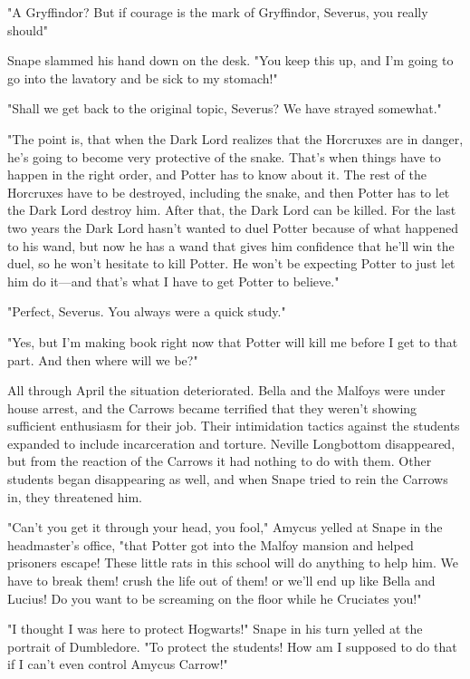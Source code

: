 "A Gryffindor? But if courage is the mark of Gryffindor, Severus, you really should{\el}"

Snape slammed his hand down on the desk. "You keep this up, and I'm going to go into the lavatory and be sick to my stomach!"

"Shall we get back to the original topic, Severus? We have strayed somewhat."

"The point is, that when the Dark Lord realizes that the Horcruxes are in danger, he's going to become very protective of the snake. That's when things have to happen in the right order, and Potter has to know about it. The rest of the Horcruxes have to be destroyed, including the snake, and then Potter has to let the Dark Lord destroy him. After that, the Dark Lord can be killed. For the last two years the Dark Lord hasn't wanted to duel Potter because of what happened to his wand, but now he has a wand that gives him confidence that he'll win the duel, so he won't hesitate to kill Potter. He won't be expecting Potter to just let him do it—and that's what I have to get Potter to believe."

"Perfect, Severus. You always were a quick study."

"Yes, but I'm making book right now that Potter will kill me before I get to that part. And then where will we be?"

All through April the situation deteriorated. Bella and the Malfoys were under house arrest, and the Carrows became terrified that they weren't showing sufficient enthusiasm for their job. Their intimidation tactics against the students expanded to include incarceration and torture. Neville Longbottom disappeared, but from the reaction of the Carrows it had nothing to do with them. Other students began disappearing as well, and when Snape tried to rein the Carrows in, they threatened him.

"Can't you get it through your head, you fool," Amycus yelled at Snape in the headmaster's office, "that Potter got into the Malfoy mansion and helped prisoners escape! These little rats in this school will do anything to help him. We have to break them! crush the life out of them! or we'll end up like Bella and Lucius! Do you want to be screaming on the floor while he Cruciates you!"

"I thought I was here to protect Hogwarts!" Snape in his turn yelled at the portrait of Dumbledore. "To protect the students! How am I supposed to do that if I can't even control Amycus Carrow!"

